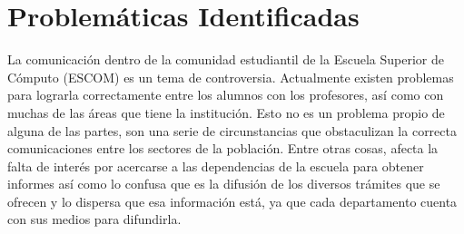 	\section{Problemáticas Identificadas}



		La comunicación dentro de la comunidad estudiantil de la Escuela Superior de Cómputo (ESCOM) es un tema de controversia. Actualmente existen problemas para lograrla correctamente entre los alumnos con los profesores, así como con muchas de las áreas que tiene la institución. Esto no es un problema propio de alguna de las partes, son una serie de circunstancias que obstaculizan la correcta comunicaciones entre los sectores de la población. Entre otras cosas, afecta la falta de interés por acercarse a las dependencias de la escuela para obtener informes así como lo confusa que es la difusión de los diversos trámites que se ofrecen y lo dispersa que esa información está, ya que cada departamento cuenta con sus medios para difundirla.\\
	
